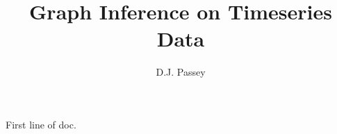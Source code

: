 \documentclass{article}
\title{Graph Inference on Timeseries Data}
\author{D.J. Passey}
\begin{document}
\maketitle

    First line of doc.
\end{document}
